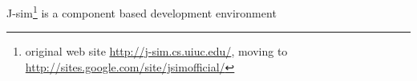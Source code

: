 \label{subsec:jsim}
J-sim\footnote {original web site \url{http://j-sim.cs.uiuc.edu/}, moving to 
\url{http://sites.google.com/site/jsimofficial/}} is a component based development
environment
